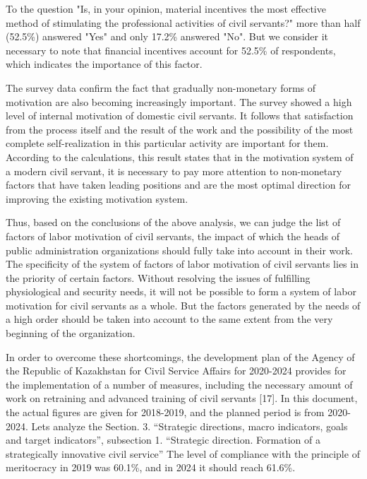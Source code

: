 \begin{multicols}{2}
To the question "Is, in your opinion, material incentives the most
effective method of stimulating the professional activities of civil
servants?" more than half (52.5\%) answered "Yes" and only 17.2\%
answered "No". But we consider it necessary to note that financial
incentives account for 52.5\% of respondents, which indicates the
importance of this factor.

The survey data confirm the fact that gradually non-monetary forms of
motivation are also becoming increasingly important. The survey showed a
high level of internal motivation of domestic civil servants. It follows
that satisfaction from the process itself and the result of the work and
the possibility of the most complete self-realization in this particular
activity are important for them. According to the calculations, this
result states that in the motivation system of a modern civil servant,
it is necessary to pay more attention to non-monetary factors that have
taken leading positions and are the most optimal direction for improving
the existing motivation system.

Thus, based on the conclusions of the above analysis, we can judge the
list of factors of labor motivation of civil servants, the impact of
which the heads of public administration organizations should fully take
into account in their work. The specificity of the system of factors of
labor motivation of civil servants lies in the priority of certain
factors. Without resolving the issues of fulfilling physiological and
security needs, it will not be possible to form a system of labor
motivation for civil servants as a whole. But the factors generated by
the needs of a high order should be taken into account to the same
extent from the very beginning of the organization.

In order to overcome these shortcomings, the development plan of the
Agency of the Republic of Kazakhstan for Civil Service Affairs for
2020-2024 provides for the implementation of a number of measures,
including the necessary amount of work on retraining and advanced
training of civil servants {[}17{]}. In this document, the actual
figures are given for 2018-2019, and the planned period is from
2020-2024. Let\textquotesingle s analyze the Section. 3. ``Strategic
directions, macro indicators, goals and target indicators'', subsection
1. ``Strategic direction. Formation of a strategically innovative civil
service'' The level of compliance with the principle of meritocracy in
2019 was 60.1\%, and in 2024 it should reach 61.6\%.


\end{multicols}
